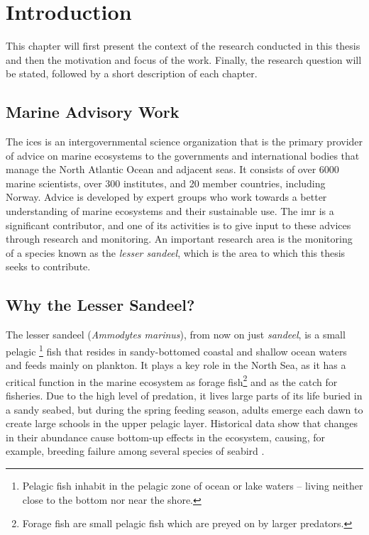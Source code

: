 \chapter{Introduction}
    This chapter will first present the context of the research conducted in this thesis and then the motivation and focus of the work. Finally, the research question will be stated, followed by a short description of each chapter. 
    
    
    

\section{Marine Advisory Work}
    The \gls{ices} is an intergovernmental science organization that is the primary provider of advice on marine ecosystems to the governments and international bodies that manage the North Atlantic Ocean and adjacent seas\cite{ICES2020}. It consists of over 6000 marine scientists, over 300 institutes, and 20 member countries, including Norway. Advice is developed by expert groups who work towards a better understanding of marine ecosystems and their sustainable use. The \gls{imr} is a significant  contributor, and one of its activities is to give input to these advices through research and monitoring. An important research area is the monitoring of a species known as the \textit{lesser sandeel}, which is the area to which this thesis seeks to contribute.
    
\section{Why the Lesser Sandeel?}
    The lesser sandeel (\textit{Ammodytes marinus}), from now on just \textit{sandeel}, is
    a small pelagic \footnote{Pelagic fish inhabit in the pelagic zone of ocean or lake waters – living neither close to the bottom nor near the shore.} fish that resides in sandy-bottomed coastal and shallow ocean waters and feeds mainly on plankton. It plays a key role in the North Sea, as it has a critical function in the marine ecosystem as forage fish\footnote{Forage fish are small pelagic fish which are preyed on by larger predators.} and as the catch for fisheries. Due to the high level of predation, it lives large parts of its life buried in a sandy seabed, but during the spring feeding season, adults emerge each dawn to create large schools in the upper pelagic layer. Historical data show that changes in their abundance cause bottom-up effects in the ecosystem, causing, for example, breeding failure among several species of seabird \cite{johnsen2017collective}. 
    

